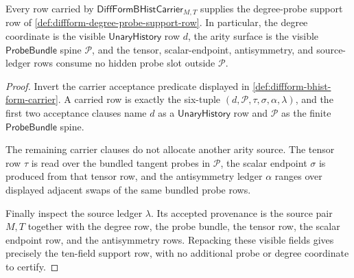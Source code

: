 \begin{theorem}
\label{thm:diffform-degree-probe-carrier-admissibility}
Every row carried by $\mathsf{DiffFormBHistCarrier}_{M,T}$ supplies the
degree-probe support row of
\autoref{def:diffform-degree-probe-support-row}. In particular, the degree
coordinate is the visible $\mathsf{UnaryHistory}$ row $d$, the arity surface is
the visible $\mathsf{ProbeBundle}$ spine $\mathcal{P}$, and the tensor,
scalar-endpoint, antisymmetry, and source-ledger rows consume no hidden probe
slot outside $\mathcal{P}$.
\end{theorem}
\begin{proof}
Invert the carrier acceptance predicate displayed in
\autoref{def:diffform-bhist-form-carrier}. A carried row is exactly the
six-tuple $(d,\mathcal{P},\tau,\sigma,\alpha,\lambda)$, and the first two
acceptance clauses name $d$ as a $\mathsf{UnaryHistory}$ row and
$\mathcal{P}$ as the finite $\mathsf{ProbeBundle}$ spine.

The remaining carrier clauses do not allocate another arity source. The
tensor row $\tau$ is read over the bundled tangent probes in
$\mathcal{P}$, the scalar endpoint $\sigma$ is produced from that tensor row,
and the antisymmetry ledger $\alpha$ ranges over displayed adjacent swaps of
the same bundled probe rows.

Finally inspect the source ledger $\lambda$. Its accepted provenance is the
source pair $M,T$ together with the degree row, the probe bundle, the tensor
row, the scalar endpoint row, and the antisymmetry rows. Repacking these
visible fields gives precisely the ten-field support row, with no additional
probe or degree coordinate to certify.
\end{proof}

